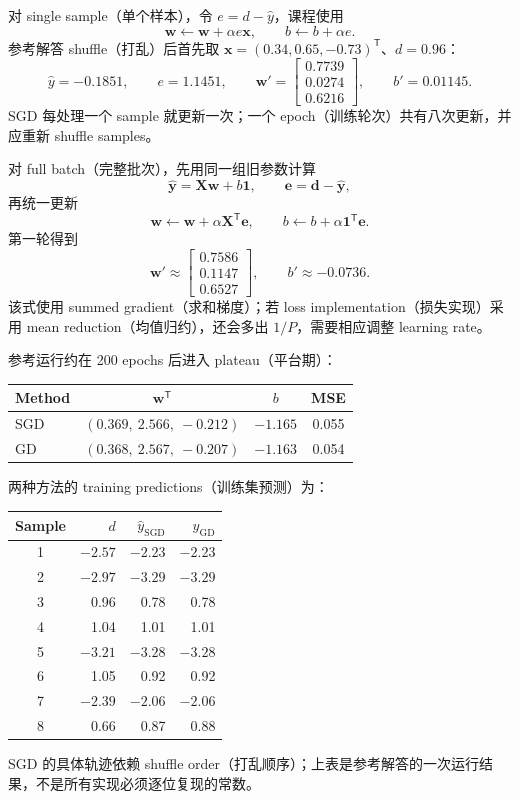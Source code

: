 \begin{checkedsolution}
对 single sample（单个样本），令 $e=d-\hat y$，课程使用
\[
  \bm w\leftarrow\bm w+\alpha e\bm x,
  \qquad b\leftarrow b+\alpha e.
\]
参考解答 shuffle（打乱）后首先取 $\bm x=(0.34,0.65,-0.73)^{\mathsf T}$、$d=0.96$：
\[
  \hat y=-0.1851,\qquad e=1.1451,\qquad
  \bm w'=
  \begin{bmatrix}0.7739\\0.0274\\0.6216\end{bmatrix},\qquad
  b'=0.01145.
\]
SGD 每处理一个 sample 就更新一次；一个 epoch（训练轮次）共有八次更新，并应重新 shuffle samples。

对 full batch（完整批次），先用同一组旧参数计算
\[
  \hat{\bm y}=\bm X\bm w+b\bm 1,\qquad
  \bm e=\bm d-\hat{\bm y},
\]
再统一更新
\[
  \bm w\leftarrow\bm w+\alpha\bm X^{\mathsf T}\bm e,
  \qquad b\leftarrow b+\alpha\bm 1^{\mathsf T}\bm e.
\]
第一轮得到
\[
  \bm w'\approx
  \begin{bmatrix}0.7586\\0.1147\\0.6527\end{bmatrix},\qquad
  b'\approx-0.0736.
\]
该式使用 summed gradient（求和梯度）；若 loss implementation（损失实现）采用 mean reduction（均值归约），还会多出 $1/P$，需要相应调整 learning rate。

参考运行约在 200 epochs 后进入 plateau（平台期）：
\begin{center}
\small
\begin{tabular}{@{}lccc@{}}
  \toprule
  Method & $\bm w^{\mathsf T}$ & $b$ & MSE \\
  \midrule
  SGD & $(0.369,\ 2.566,\ -0.212)$ & $-1.165$ & 0.055 \\
  GD  & $(0.368,\ 2.567,\ -0.207)$ & $-1.163$ & 0.054 \\
  \bottomrule
\end{tabular}
\end{center}
两种方法的 training predictions（训练集预测）为：
\begin{center}
\small
\begin{tabular}{@{}crrr@{}}
  \toprule
  Sample & $d$ & $\hat y_{\mathrm{SGD}}$ & $\hat y_{\mathrm{GD}}$ \\
  \midrule
  1 & $-2.57$ & $-2.23$ & $-2.23$ \\
  2 & $-2.97$ & $-3.29$ & $-3.29$ \\
  3 &  0.96 &  0.78 &  0.78 \\
  4 &  1.04 &  1.01 &  1.01 \\
  5 & $-3.21$ & $-3.28$ & $-3.28$ \\
  6 &  1.05 &  0.92 &  0.92 \\
  7 & $-2.39$ & $-2.06$ & $-2.06$ \\
  8 &  0.66 &  0.87 &  0.88 \\
  \bottomrule
\end{tabular}
\end{center}
SGD 的具体轨迹依赖 shuffle order（打乱顺序）；上表是参考解答的一次运行结果，不是所有实现必须逐位复现的常数。
\end{checkedsolution}

